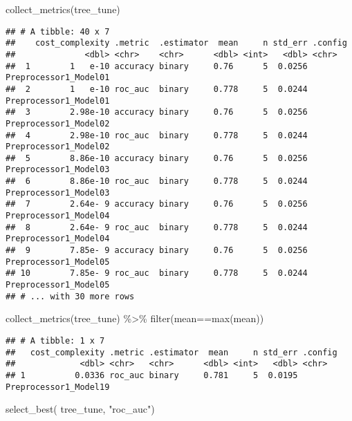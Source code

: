 \documentclass[
]{article}
\newenvironment{Shaded}{\begin{snugshade}}{\end{snugshade}}
\newcommand{\FunctionTok}[1]{\textcolor[rgb]{0.00,0.00,0.00}{#1}}
\newcommand{\NormalTok}[1]{#1}
\newcommand{\SpecialCharTok}[1]{\textcolor[rgb]{0.00,0.00,0.00}{#1}}
\newcommand{\StringTok}[1]{\textcolor[rgb]{0.31,0.60,0.02}{#1}}
\begin{document}
\begin{Shaded}
\begin{Highlighting}[]
\FunctionTok{collect\_metrics}\NormalTok{(tree\_tune)}
\end{Highlighting}
\end{Shaded}

\begin{verbatim}
## # A tibble: 40 x 7
##    cost_complexity .metric  .estimator  mean     n std_err .config              
##              <dbl> <chr>    <chr>      <dbl> <int>   <dbl> <chr>                
##  1        1   e-10 accuracy binary     0.76      5  0.0256 Preprocessor1_Model01
##  2        1   e-10 roc_auc  binary     0.778     5  0.0244 Preprocessor1_Model01
##  3        2.98e-10 accuracy binary     0.76      5  0.0256 Preprocessor1_Model02
##  4        2.98e-10 roc_auc  binary     0.778     5  0.0244 Preprocessor1_Model02
##  5        8.86e-10 accuracy binary     0.76      5  0.0256 Preprocessor1_Model03
##  6        8.86e-10 roc_auc  binary     0.778     5  0.0244 Preprocessor1_Model03
##  7        2.64e- 9 accuracy binary     0.76      5  0.0256 Preprocessor1_Model04
##  8        2.64e- 9 roc_auc  binary     0.778     5  0.0244 Preprocessor1_Model04
##  9        7.85e- 9 accuracy binary     0.76      5  0.0256 Preprocessor1_Model05
## 10        7.85e- 9 roc_auc  binary     0.778     5  0.0244 Preprocessor1_Model05
## # ... with 30 more rows
\end{verbatim}

\begin{Shaded}
\begin{Highlighting}[]
\FunctionTok{collect\_metrics}\NormalTok{(tree\_tune) }\SpecialCharTok{\%\textgreater{}\%} \FunctionTok{filter}\NormalTok{(mean}\SpecialCharTok{==}\FunctionTok{max}\NormalTok{(mean))}
\end{Highlighting}
\end{Shaded}

\begin{verbatim}
## # A tibble: 1 x 7
##   cost_complexity .metric .estimator  mean     n std_err .config              
##             <dbl> <chr>   <chr>      <dbl> <int>   <dbl> <chr>                
## 1          0.0336 roc_auc binary     0.781     5  0.0195 Preprocessor1_Model19
\end{verbatim}

\begin{Shaded}
\begin{Highlighting}[]
\FunctionTok{select\_best}\NormalTok{( tree\_tune, }\StringTok{"roc\_auc"}\NormalTok{)}
\end{Highlighting}
\end{Shaded}
\end{document}

